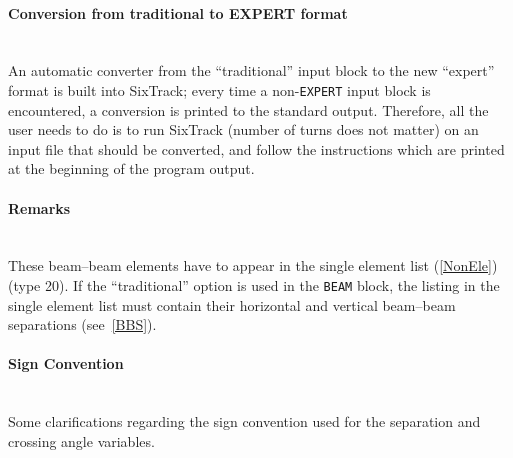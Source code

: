 \paragraph{Conversion from traditional to EXPERT format}~\\

An automatic converter from the ``traditional'' input block to the new ``expert'' format is built into SixTrack; every time a non-\texttt{EXPERT} input block is encountered, a conversion is printed to the standard output.
Therefore, all the user needs to do is to run SixTrack (number of turns does not matter) on an input file that should be converted, and follow the instructions which are printed at the beginning of the program output.

\paragraph{Remarks}~\\

These beam--beam elements have to appear in the single element list (\ref{NonEle}) (type 20).
If the ``traditional'' option is used in the \texttt{BEAM} block, the listing in the single element list must contain their horizontal and vertical beam--beam separations (see~\ref{BBS}).

\paragraph{Sign Convention}~\\

Some clarifications regarding the sign convention used for the separation and crossing angle variables.

